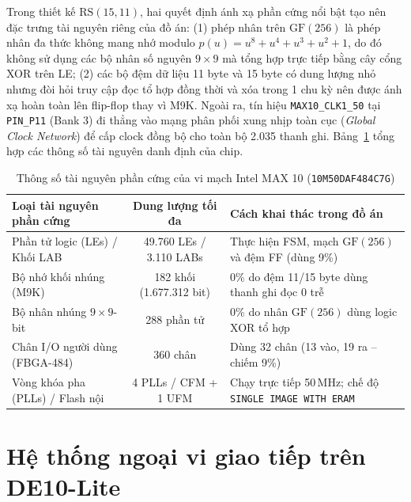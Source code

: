 Trong thiết kế $\mathrm{RS}(15,11)$, hai quyết định ánh xạ phần cứng nổi bật tạo nên đặc trưng tài nguyên riêng của đồ án: (1) phép nhân trên $\mathrm{GF}(256)$ là phép nhân đa thức không mang nhớ modulo $p(u) = u^8 + u^4 + u^3 + u^2 + 1$, do đó không sử dụng các bộ nhân số nguyên $9\times 9$ mà tổng hợp trực tiếp bằng cây cổng XOR trên LE; (2) các bộ đệm dữ liệu 11 byte và 15 byte có dung lượng nhỏ nhưng đòi hỏi truy cập đọc tổ hợp đồng thời và xóa trong 1 chu kỳ nên được ánh xạ hoàn toàn lên flip-flop thay vì M9K. Ngoài ra, tín hiệu \texttt{MAX10\_CLK1\_50} tại \texttt{PIN\_P11} (Bank 3) đi thẳng vào mạng phân phối xung nhịp toàn cục (\textit{Global Clock Network}) để cấp clock đồng bộ cho toàn bộ 2.035 thanh ghi. Bảng~\ref{tab:max10-resources} tổng hợp các thông số tài nguyên danh định của chip.

\begin{table}[!htb]
    \centering
    \caption{Thông số tài nguyên phần cứng của vi mạch Intel MAX 10 (\texttt{10M50DAF484C7G})}
    \label{tab:max10-resources}
    \footnotesize
    \renewcommand{\arraystretch}{1.1}
    \begin{tabular}{p{5.2cm} c p{5.5cm}}
        \toprule
        \textbf{Loại tài nguyên phần cứng} & \textbf{Dung lượng tối đa} & \textbf{Cách khai thác trong đồ án} \\
        \midrule
        Phần tử logic (LEs) / Khối LAB & 49.760 LEs / 3.110 LABs & Thực hiện FSM, mạch $\mathrm{GF}(256)$ và đệm FF (dùng 9\%) \\
        Bộ nhớ khối nhúng (M9K) & 182 khối (1.677.312 bit) & 0\% do đệm 11/15 byte dùng thanh ghi đọc 0 trễ \\
        Bộ nhân nhúng $9\times 9$-bit & 288 phần tử & 0\% do nhân $\mathrm{GF}(256)$ dùng logic XOR tổ hợp \\
        Chân I/O người dùng (FBGA-484) & 360 chân & Dùng 32 chân (13 vào, 19 ra -- chiếm 9\%) \\
        Vòng khóa pha (PLLs) / Flash nội & 4 PLLs / CFM + 1 UFM & Chạy trực tiếp 50\,MHz; chế độ \texttt{SINGLE IMAGE WITH ERAM} \\
        \bottomrule
    \end{tabular}
\end{table}

\section{Hệ thống ngoại vi giao tiếp trên DE10-Lite}
\label{sec:peripherals}

